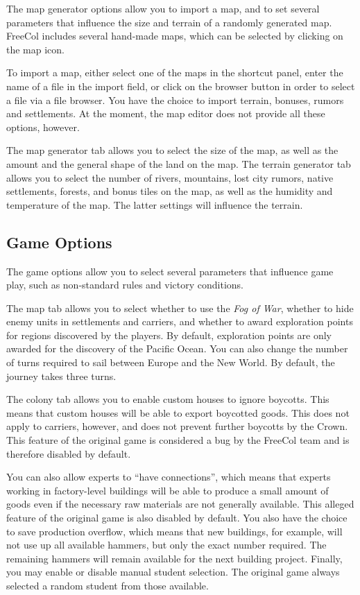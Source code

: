 \documentclass[12pt]{book}
\begin{document}
The \hypertarget{map generator options}{map generator options} allow
you to import a map, and to set several parameters that influence the
size and terrain of a randomly generated map. FreeCol includes several
hand-made maps, which can be selected by clicking on the map icon.

To import a map, either select one of the maps in the shortcut panel,
enter the name of a file in the import field, or click on the browser
button in order to select a file via a file browser. You have the
choice to import terrain, bonuses, rumors and settlements. At the
moment, the map editor does not provide all these options, however.

The map generator tab allows you to select the size of the map, as
well as the amount and the general shape of the land on the map. The
terrain generator tab allows you to select the number of rivers,
mountains, lost city rumors, native settlements, forests, and bonus
tiles on the map, as well as the humidity and temperature of the
map. The latter settings will influence the terrain.


\hypertarget{game options}{\subsection{Game Options}}

The game options allow you to select several parameters that
influence game play, such as non-standard rules and victory
conditions.

The map tab allows you to select whether to use the \textit{Fog of
  War}, whether to hide enemy units in settlements and carriers, and
whether to award exploration points for regions discovered by the
players. By default, exploration points are only awarded for the
discovery of the Pacific Ocean. You can also change the number of
turns required to sail between Europe and the New World. By default,
the journey takes three turns.

The colony tab allows you to enable custom houses to
\hypertarget{ignore boycotts}{ignore boycotts}. This means that custom houses will be able to export
boycotted goods. This does not apply to carriers, however, and does
not prevent further boycotts by the Crown. This feature of the
original game is considered a bug by the FreeCol team and is therefore
disabled by default.

You can also allow experts to ``have connections'', which means that
experts working in factory-level buildings will be able to produce a
small amount of goods even if the necessary raw materials are not
generally available. This alleged feature of the original game is also
disabled by default. You also have the choice to save production
overflow, which means that new buildings, for example, will not use up
all available hammers, but only the exact number required. The
remaining hammers will remain available for the next building
project. Finally, you may enable or disable manual student
selection. The original game always selected a random student from
those available.
\end{document}
